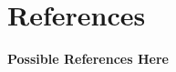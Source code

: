 \documentclass [10pt]{article}
\begin{document}



%
%
%
%
%
%
%
%
%


\section{References}
\textbf{Possible References Here}

\end{document}
